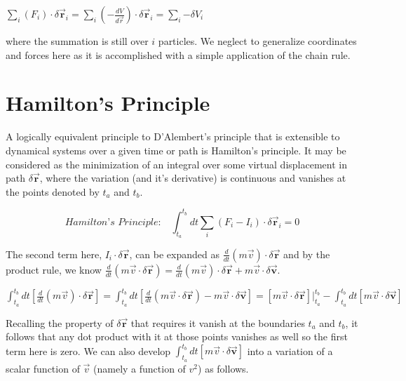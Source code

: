 \documentclass{article}\usepackage[]{graphicx}\usepackage[]{color}
\begin{document}
\begin{center}
$\sum_{i}{(F_{i})\cdot\delta \vec{\textbf{r}}_{i}}=\sum_{i}{(-\frac{dV}{d\vec{r}})\cdot\delta \vec{\textbf{r}}_{i}}=\sum_{i}{-\delta V_i}$
\end{center}

where the summation is still over $i$ particles. We neglect to generalize coordinates and forces here as it is accomplished with a simple application of the chain rule.

\section{Hamilton's Principle}

A logically equivalent principle to D'Alembert's principle that is extensible to dynamical systems over a given time or path is Hamilton's principle. It may be considered as the minimization of an integral over some virtual displacement in path $\delta\vec{\textbf{r}}$, where the variation (and it's derivative) is continuous and vanishes at the points denoted by $t_a$ and $t_b$.

\begin{equation}
\textit{Hamilton's Principle:} \quad\int_{t_a}^{t_b}dt \sum_{i}{(F_{i}-I_{i})\cdot\delta \vec{\textbf{r}}_{i}}=0
\end{equation}

The second term here, $I_i\cdot\delta \vec{\textbf{r}}$, can be expanded as $\frac{d}{dt}(m\vec{v})\cdot\delta \vec{\textbf{r}}$ and by the product rule, we know $\frac{d}{dt}(m\vec{v}\cdot \delta \vec{\textbf{r}})=\frac{d}{dt}(m\vec{v})\cdot \delta\vec{\textbf{r}}+m\vec{v}\cdot\delta\vec{\textbf{v}}$.

\begin{center}

$\int_{t_a}^{t_b}dt\left[\frac{d}{dt}(m\vec{v})\cdot\delta \vec{\textbf{r}}\right]
=\int_{t_a}^{t_b}dt\left[ \frac{d}{dt}(m\vec{v}\cdot \delta \vec{\textbf{r}})-m\vec{v}\cdot\delta\vec{\textbf{v}}\right]
=[m\vec{v}\cdot \delta \vec{\textbf{r}}]\vert_{t_a}^{t_b}-\int_{t_a}^{t_b}dt[m\vec{v}\cdot\delta\vec{\textbf{v}}]$

\end{center}

Recalling the property of $\delta\vec{\textbf{r}}$ that requires it vanish at the boundaries $t_a$ and $t_b$, it follows that any dot product with it at those points vanishes as well so the first term here is zero. We can also develop $\int_{t_a}^{t_b}dt[m\vec{v}\cdot\delta\vec{\textbf{v}}]$ into a variation of a scalar function of $\vec{v}$ (namely a function of $v^2$) as follows. 
\end{document}
